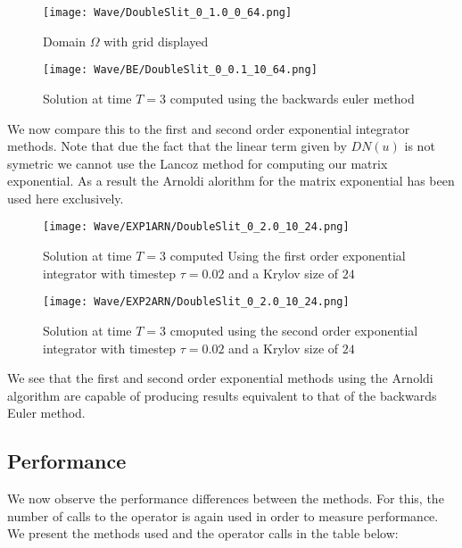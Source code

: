 \begin{figure}[H]
    \centering
    \begin{minipage}{0.49\textwidth}
        \texttt{[image: Wave/DoubleSlit\_0\_1.0\_0\_64.png]} %
        \caption{Domain $\Omega$ with grid displayed}
        \label{fig:waveOmega}
    \end{minipage}\hfill
    \centering
    \begin{minipage}{0.49\textwidth}
        \texttt{[image: Wave/BE/DoubleSlit\_0\_0.1\_10\_64.png]} %
        \caption{Solution at time $T=3$ computed using the backwards euler method}
        \label{fig:second order 32}
    \end{minipage}\hfill
\end{figure}

We now compare this to the first and second order exponential integrator methods.
Note that due the fact that the linear term given by $DN(u)$ is not symetric we cannot use the Lancoz method for computing our matrix exponential.
As a result the Arnoldi alorithm for the matrix exponential has been used here exclusively.
\begin{figure}[H]
    \centering
    \begin{minipage}{0.49\textwidth}
        \texttt{[image: Wave/EXP1ARN/DoubleSlit\_0\_2.0\_10\_24.png]} %
        \caption{Solution at time $T=3$ computed Using the first order exponential integrator with timestep $\tau = 0.02$ and a Krylov size of $24$}
        \label{fig:second order 16}
    \end{minipage}\hfill
    \centering
    \begin{minipage}{0.49\textwidth}
        \texttt{[image: Wave/EXP2ARN/DoubleSlit\_0\_2.0\_10\_24.png]} %
        \caption{Solution at time $T=3$ cmoputed using the second order exponential integrator with timestep $\tau = 0.02$ and a Krylov size of $24$}
        \label{fig:second order 32}
    \end{minipage}\hfill
\end{figure}

We see that the first and second order exponential methods using the Arnoldi algorithm are capable of producing results equivalent to that of the backwards Euler method.

\subsection{Performance}
We now observe the performance differences between the methods.
For this, the number of calls to the operator is again used in order to measure performance.
We present the methods used and the operator calls in the table below:

